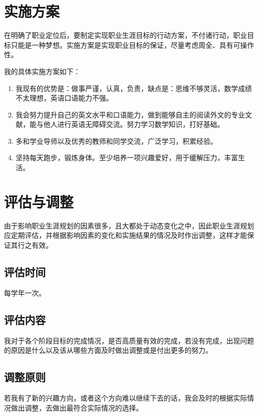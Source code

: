 \documentclass{article}
\begin{document}
\section{实施方案}
在明确了职业定位后，要制定实现职业生涯目标的行动方案，不付诸行动，职业目标只能是一种梦想。实施方案是实现职业目标的保证，尽量考虑周全、具有可操作性。\par
我的具体实施方案如下：\par
\begin{enumerate}[1、]
	\item  我现有的优势是：做事严谨，认真，负责，缺点是：思维不够灵活，数学成绩不太理想，英语口语能力不强。
	\item 我会努力提升自己的英文水平和口语能力，做到能够自主的阅读外文的专业文献，能与他人进行英语无障碍交流。努力学习数学知识，打好基础。
	\item 多和学业导师以及优秀的教师和同学交流，广泛学习，积累经验。
	\item 坚持每天跑步，锻炼身体。至少培养一项兴趣爱好，用于缓解压力，丰富生活。
\end{enumerate}
\newpage
\section{评估与调整}
由于影响职业生涯规划的因素很多，且大都处于动态变化之中，因此职业生涯规划应定期评估，并根据影响因素的变化和实施结果的情况及时作出调整，这样才能保证其行之有效。\par 
\subsection{评估时间}
每学年一次。\par
\subsection{评估内容}
我对于各个阶段目标的完成情况，是否高质量有效的完成，若没有完成，出现问题的原因是什么以及该从哪些方面及时做出调整或是付出更多的努力。\par
\subsection{调整原则}
若我有了新的兴趣方向，或者这个方向难以继续下去的话，我会及时的根据实际情况做出调整，去做出最符合实际情况的选择。\par
\end{document}

